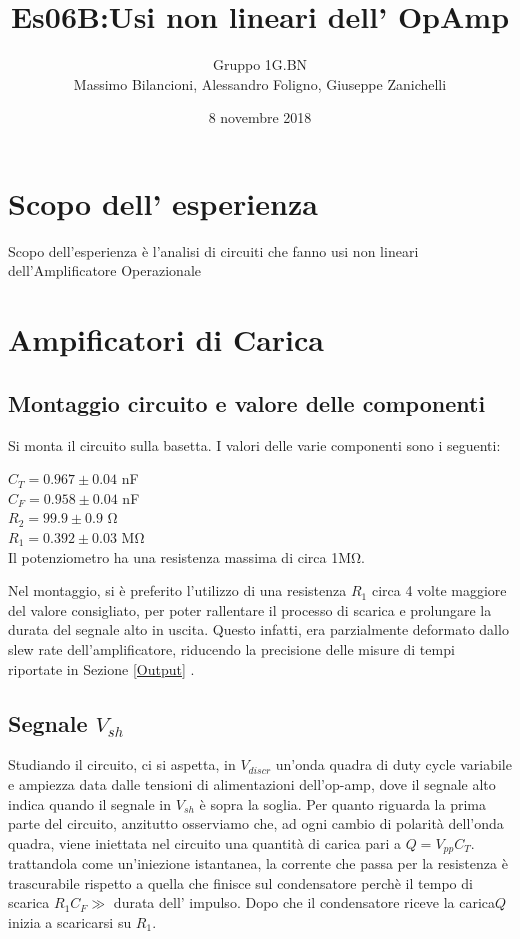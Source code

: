 \documentclass[10pt,a4paper]{article}
\author{Gruppo 1G.BN \\ Massimo Bilancioni, Alessandro Foligno, Giuseppe Zanichelli }
\title{Es06B:Usi non lineari dell’ OpAmp }
\begin{document}
	\date{8 novembre 2018}
	\maketitle
	
	
	\section*{Scopo dell' esperienza}
	Scopo dell'esperienza è l'analisi di circuiti che fanno usi non lineari dell'Amplificatore Operazionale




\section{Ampificatori di Carica}
	\subsection{Montaggio circuito e valore delle componenti}
		Si monta il circuito sulla basetta.
		I valori delle varie componenti sono i seguenti:



$C_T=0.967\pm 0.04$ \si{\nano\farad} \\


$C_F=0.958\pm 0.04$ \si{\nano\farad}\\


$R_2=99.9\pm 0.9 $ \si{\ohm}\\$R_1=0.392 \pm0.03   $ \si{\mega \ohm}\\
				
Il potenziometro ha una resistenza massima di circa 1\si{\mega\ohm}.


		
Nel montaggio, si è preferito l'utilizzo di una resistenza $R_1$ circa 4 volte maggiore del valore consigliato, per poter rallentare il processo di scarica e prolungare la durata del segnale alto in uscita.
		Questo infatti, era parzialmente deformato dallo slew rate dell'amplificatore, riducendo la precisione delle misure di tempi riportate in Sezione \ref{Output} .
	\subsection{Segnale $V_{sh}$}
		Studiando il circuito, ci si aspetta, in $V_{discr}$ un'onda quadra di duty cycle variabile e ampiezza data dalle tensioni di alimentazioni dell'op-amp, dove il segnale alto indica quando il segnale in $V_{sh}$ è sopra la soglia.
		Per quanto riguarda la prima parte del circuito, anzitutto osserviamo che, ad ogni cambio di polarità dell'onda quadra, viene iniettata nel circuito una quantità di carica pari a $Q=V_{pp} C_T$. trattandola come un'iniezione istantanea, la  corrente che passa per la resistenza è trascurabile rispetto a quella che finisce sul condensatore perchè il tempo di scarica $R_1 C_F \gg$ durata dell' impulso.
		Dopo che il condensatore riceve la carica$Q$ inizia a scaricarsi su $R_1$. 
\end{document}

